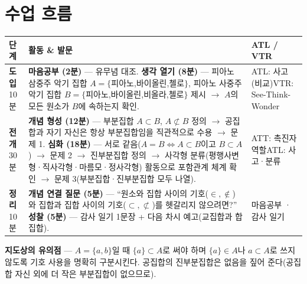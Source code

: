\documentclass[11pt,a4paper]{article}
\begin{document}
\section{수업 흐름}
\begin{tabularx}{\linewidth}{@{}>{\centering\arraybackslash}p{1.6cm}X>{\raggedright\arraybackslash\small}p{3.1cm}@{}}
\toprule
\textbf{단계} & \textbf{활동 \& 발문} & \textbf{ATL / VTR} \\
\midrule
\textcolor{goldstrong}{\textbf{도입}}\newline\footnotesize 10분 &
\textbf{마음공부 (2분)} --- 유무념 대조.\newline
\textbf{생각 열기 (8분)} --- 피아노 삼중주 악기 집합 $A=\{$피아노,바이올린,첼로$\}$, 피아노 사중주 악기 집합 $B=\{$피아노,바이올린,비올라,첼로$\}$ 제시 $\to$ $A$의 모든 원소가 $B$에 속하는지 확인. &
ATL: 사고(비교)\newline VTR: See-Think-Wonder \\
\addlinespace
\textcolor{goldstrong}{\textbf{전개}}\newline\footnotesize 30분 &
\textbf{개념 형성 (12분)} --- 부분집합 $A\subset B$, $A\not\subset B$ 정의 $\to$ 공집합과 자기 자신은 항상 부분집합임을 직관적으로 수용 $\to$ 문제 1.\newline
\textbf{심화 (18분)} --- 서로 같음($A=B \Leftrightarrow A\subset B$이고 $B\subset A$) $\to$ 문제 2 $\to$ 진부분집합 정의 $\to$ 사각형 분류(평행사변형·직사각형·마름모·정사각형) 활동으로 포함관계 체계 확인 $\to$ 문제 3(부분집합·진부분집합 모두 나열). &
ATT: 촉진자 역할\newline ATL: 사고·분류 \\
\addlinespace
\textcolor{goldstrong}{\textbf{정리}}\newline\footnotesize 10분 &
\textbf{개념 연결 질문 (5분)} --- ``원소와 집합 사이의 기호($\in,\notin$)와 집합과 집합 사이의 기호($\subset,\not\subset$)를 헷갈리지 않으려면?''\newline
\textbf{성찰 (5분)} --- 감사 일기 1문장 + 다음 차시 예고(교집합과 합집합). &
마음공부 · 감사 일기 \\
\bottomrule
\end{tabularx}

\begin{calloutbox}
\textbf{지도상의 유의점} --- $A=\{a,b\}$일 때 $\{a\}\subset A$로 써야 하며 $\{a\}\in A$나 $a\subset A$로 쓰지 않도록 기호 사용을 명확히 구분시킨다. 공집합의 진부분집합은 없음을 짚어 준다(공집합 자신 외에 더 작은 부분집합이 없으므로).
\end{calloutbox}
\end{document}
